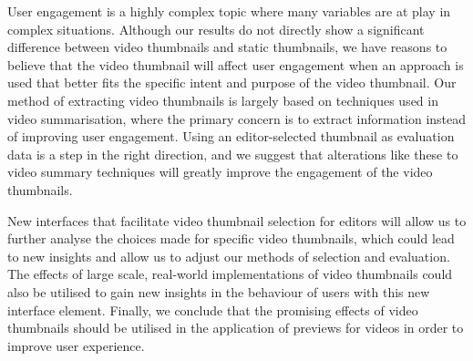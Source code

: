 \documentclass{../resources/sig-alternate-05-2015}
\begin{document}
User engagement is a highly complex topic where many variables are at play in complex situations. Although our results do not directly show a significant difference between video thumbnails and static thumbnails, we have reasons to believe that the video thumbnail will affect user engagement when an approach is used that better fits the specific intent and purpose of the video thumbnail. Our method of extracting video thumbnails is largely based on techniques used in video summarisation, where the primary concern is to extract information instead of improving user engagement. Using an editor-selected thumbnail as evaluation data is a step in the right direction, and we suggest that alterations like these to video summary techniques will greatly improve the engagement of the video thumbnails.

New interfaces that facilitate video thumbnail selection for editors will allow us to further analyse the choices made for specific video thumbnails, which could lead to new insights and allow us to adjust our methods of selection and evaluation. The effects of large scale, real-world implementations of video thumbnails could also be utilised to gain new insights in the behaviour of users with this new interface element. Finally, we conclude that the promising effects of video thumbnails should be utilised in the application of previews for videos in order to improve user experience.
\end{document}
